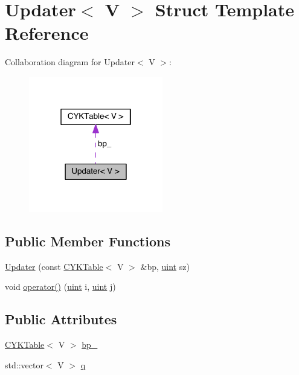 \hypertarget{struct_updater}{\section{Updater$<$ V $>$ Struct Template Reference}
\label{struct_updater}
}


Collaboration diagram for Updater$<$ V $>$\+:
\nopagebreak
\begin{figure}[H]
\begin{center}
\leavevmode
\includegraphics[width=166pt]{struct_updater__coll__graph}
\end{center}
\end{figure}
\subsection*{Public Member Functions}
\begin{DoxyCompactItemize}
\item 
\hyperlink{struct_updater_a22fa30504d4d9037dc54383ad9ecc050}{Updater} (const \hyperlink{class_c_y_k_table}{C\+Y\+K\+Table}$<$ V $>$ \&bp, \hyperlink{cyktable_8h_a91ad9478d81a7aaf2593e8d9c3d06a14}{uint} sz)
\item 
void \hyperlink{struct_updater_ae4e44cdd8b593bc556a963463f80f8c4}{operator()} (\hyperlink{cyktable_8h_a91ad9478d81a7aaf2593e8d9c3d06a14}{uint} i, \hyperlink{cyktable_8h_a91ad9478d81a7aaf2593e8d9c3d06a14}{uint} j)
\end{DoxyCompactItemize}
\subsection*{Public Attributes}
\begin{DoxyCompactItemize}
\item 
\hyperlink{class_c_y_k_table}{C\+Y\+K\+Table}$<$ V $>$ \hyperlink{struct_updater_a42ded2de185caa0a4ac98bf2dc45a3f8}{bp\+\_\+}
\item 
std\+::vector$<$ V $>$ \hyperlink{struct_updater_a0e7e32e00a5e6c8dda358f47eadf1b1c}{q}
\end{DoxyCompactItemize}


